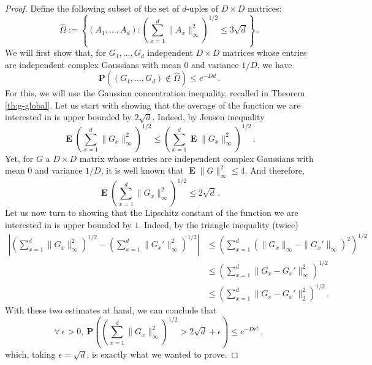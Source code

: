 \documentclass{amsart}
\renewcommand{\P}{\mathbf{P}}
\renewcommand{\leq}{\leqslant}
\DeclareMathOperator{\E}{\mathbf{E}}
\begin{document}
\begin{proof}
    Define the following subset of the set of $d$-uples of $D\times D$ matrices:
    \[ \hat{\Omega} := \left\{ (A_1,\ldots,A_d) : \left(\sum_{x=1}^d \|A_x\|_{\infty}^2 \right)^{1/2} \leq 3\sqrt{d} \right\} \, . \]
    We will first show that, for $G_1,\ldots,G_d$ independent $D\times D$ matrices whose entries are independent complex Gaussians with mean $0$ and variance $1/D$, we have
    \[ \P\left( (G_1,\ldots,G_d)\notin\hat{\Omega} \right) \leq e^{-Dd}\, . \]
    For this, we will use the Gaussian concentration inequality, recalled in Theorem \ref{th:g-global}. Let us start with showing that the average of the function we are interested in is upper bounded by $2\sqrt{d}$. Indeed, by Jensen inequality
    \[ \E \left(\sum_{x=1}^d \|G_x\|_{\infty}^2 \right)^{1/2} \leq \left( \sum_{x=1}^d \E\|G_x\|_{\infty}^2 \right)^{1/2} \, . \]
    Yet, for $G$ a $D\times D$ matrix whose entries are independent complex Gaussians with mean $0$ and variance $1/D$, it is well known that $\E\|G\|_{\infty}^2\leq 4$. And therefore,
    \[ \E \left(\sum_{x=1}^d \|G_x\|_{\infty}^2 \right)^{1/2} \leq 2\sqrt{d} \, .\]
    Let us now turn to showing that the Lipschitz constant of the function we are interested in is upper bounded by $1$. Indeed, by the triangle inequality (twice)
    \begin{align*}
        \left| \left(\sum_{x=1}^d \|G_x\|_{\infty}^2 \right)^{1/2} - \left(\sum_{x=1}^d \|G_x'\|_{\infty}^2 \right)^{1/2} \right| & \leq \left( \sum_{x=1}^d \left(\|G_x\|_{\infty}- \|G_x'\|_{\infty}\right)^2 \right)^{1/2} \\
                                                                                                                                  & \leq \left( \sum_{x=1}^d \|G_x-G_x'\|_{\infty}^2 \right)^{1/2}                            \\
                                                                                                                                  & \leq \left( \sum_{x=1}^d \|G_x-G_x'\|_2^2 \right)^{1/2} \, .
    \end{align*}
    With these two estimates at hand, we can conclude that
    \[ \forall\ \epsilon>0,\ \P\left( \left(\sum_{x=1}^d \|G_x\|_{\infty}^2 \right)^{1/2} > 2\sqrt{d} +\epsilon \right) \leq e^{-D\epsilon^2} \, , \]
    which, taking $\epsilon=\sqrt{d}$, is exactly what we wanted to prove.


\end{proof}
\end{document}
